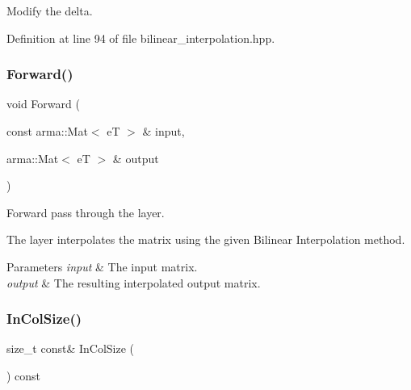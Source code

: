 Modify the delta. 



Definition at line 94 of file bilinear\+\_\+interpolation.\+hpp.

\mbox{\label{classmlpack_1_1ann_1_1BilinearInterpolation_a461f849bc638c15bec262dc9c3a58abe}} 
\subsubsection{Forward()}
{\footnotesize\ttfamily void Forward (\begin{DoxyParamCaption}\item[{const arma\+::\+Mat$<$ eT $>$ \&}]{input,  }\item[{arma\+::\+Mat$<$ eT $>$ \&}]{output }\end{DoxyParamCaption})}



Forward pass through the layer. 

The layer interpolates the matrix using the given Bilinear Interpolation method.


\begin{DoxyParams}{Parameters}
{\em input} & The input matrix. \\
\hline
{\em output} & The resulting interpolated output matrix. \\
\hline
\end{DoxyParams}
\mbox{\label{classmlpack_1_1ann_1_1BilinearInterpolation_a3866c02efcb03b37b6df7bb8299c889b}} 
\subsubsection{In\+Col\+Size()\hspace{0.1cm}{\footnotesize\ttfamily [1/2]}}
{\footnotesize\ttfamily size\+\_\+t const\& In\+Col\+Size (\begin{DoxyParamCaption}{ }\end{DoxyParamCaption}) const\hspace{0.3cm}{\ttfamily [inline]}}



